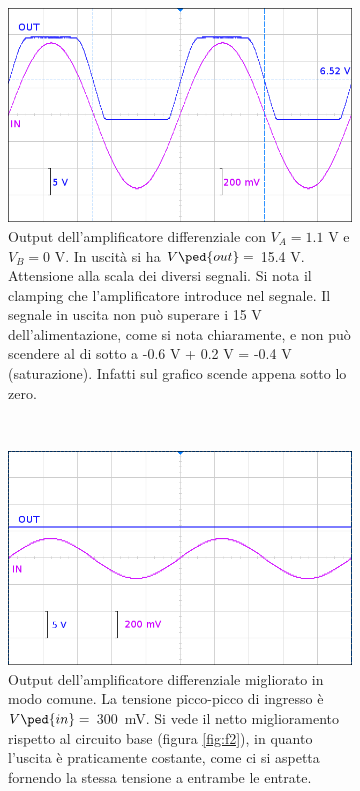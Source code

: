 \begin{figure}
    \begin{subfigure}[t]{0.48\textwidth}
        \includegraphics[width=\textwidth]{f3.png}
        \caption{Output dell'amplificatore differenziale con $V_A = 1.1$ V e $V_B = 0$ V. In uscità si ha
        $V\ped{out} = $ 15.4 V. Attensione alla scala dei diversi segnali. Si nota il clamping che l'amplificatore introduce nel segnale.
        Il segnale in uscita non può superare i 15 V dell'alimentazione, come si nota chiaramente, e non può scendere al di sotto a -0.6 V + 0.2 V = -0.4 V (saturazione).
        Infatti sul grafico scende appena sotto lo zero.}
        \label{fig:f3}
    \end{subfigure}
    ~
    \begin{subfigure}[t]{0.48\textwidth}
        \includegraphics[width=\textwidth]{f4.png}
        \caption{Output dell'amplificatore differenziale migliorato in modo comune. La tensione picco-picco di ingresso
            è $V\ped{in} =$ \SI{300}{\milli\volt}. Si vede il netto miglioramento rispetto al circuito base (figura \ref{fig:f2}), in quanto l'uscita è praticamente costante,
        come ci si aspetta fornendo la stessa tensione a entrambe le entrate.}
        \label{fig:f4}
    \end{subfigure}

    \caption{}
    \label{fig:graphs}
\end{figure}

